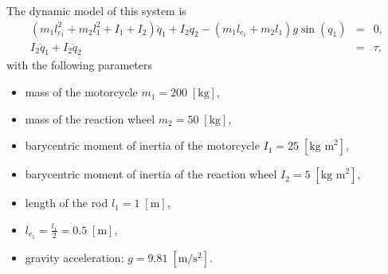 \documentclass{article}
\begin{document}
\noindent
The dynamic model of this system is
\begin{eqnarray*}
(m_1 l_{c_1}^2 + m_2 l_1^2 + I_1 + I_2) \ddot{q}_1 + I_2  \ddot{q}_2 - (m_1 l_{c_1} + m_2 l_1) g \sin (q_1)&=& 0,\\
I_2  \ddot{q}_1 + I_2  \ddot{q}_2&=& \tau,
\end{eqnarray*}
with the following parameters 
\begin{itemize}

\item
mass of the motorcycle $m_1 = 200 \; [\text{kg}]$, 

\item
mass of the reaction wheel $m_2 = 50 \; [\text{kg}]$, 

\item
barycentric moment of inertia of the motorcycle $I_1 = 25 \; [\text{kg m}^2]$, 

\item
barycentric moment of inertia of the reaction wheel $I_2 = 5 \; [\text{kg m}^2]$, 

\item
length of the rod $l_1 = 1 \; [\text{m}]$, 

\item
$l_{c_1} = \frac{l_1}{2} = 0.5\; [\text{m}]$,

\item
gravity acceleration: $g = 9.81 \; [\text{m}/\text{s}^2]$.
\end{itemize}
\end{document}
